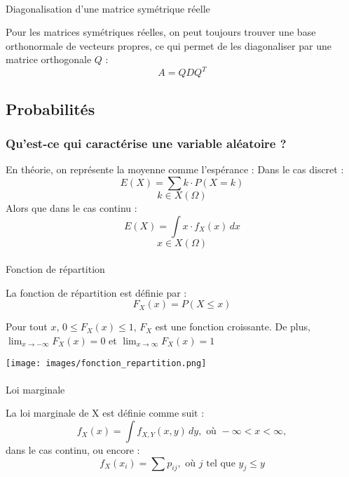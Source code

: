 \documentclass[
  letterpaper,
  DIV=11,
  numbers=noendperiod]{scrartcl}
\makeatletter
\let\oldparagraph\paragraph
\renewcommand{\paragraph}{
    \@ifstar
      \xxxParagraphStar
      \xxxParagraphNoStar
  }
\newcommand{\xxxParagraphStar}[1]{\oldparagraph*{#1}\mbox{}}
\newcommand{\xxxParagraphNoStar}[1]{\oldparagraph{#1}\mbox{}}
\makeatother
\begin{document}
\paragraph{Diagonalisation d'une matrice symétrique
réelle}\label{diagonalisation-dune-matrice-symuxe9trique-ruxe9elle}

Pour les matrices symétriques réelles, on peut toujours trouver une base
orthonormale de vecteurs propres, ce qui permet de les diagonaliser par
une matrice orthogonale \(Q\) : \[A = QDQ^T\]

\subsection{Probabilités}\label{probabilituxe9s}

\subsubsection{Qu'est-ce qui caractérise une variable aléatoire
?}\label{quest-ce-qui-caractuxe9rise-une-variable-aluxe9atoire}

En théorie, on représente la moyenne comme l'espérance : Dans le cas
discret : \[E(X) = \sum k \cdot P(X = k)\] \[k \in X(\Omega)\] Alors que
dans le cas continu : \[E(X) = \int x \cdot f_X(x) \, dx\]
\[x \in X(\Omega)\]

\paragraph{Fonction de répartition}\label{fonction-de-ruxe9partition}

La fonction de répartition est définie par :
\[F_X(x) = P(X \leqslant x)\]

Pour tout \(x\), \(0 \leqslant F_X(x) \leqslant 1\), \(F_X\) est une
fonction croissante. De plus, \(\lim_{x \to -\infty} F_X(x) = 0\) et
\(\lim_{x \to \infty} F_X(x) = 1\)

\begin{center}
\texttt{[image: images/fonction\_repartition.png]}
\end{center}

\paragraph{Loi marginale}\label{loi-marginale}

La loi marginale de X est définie comme suit :
\[f_X(x) = \int f_{X, Y}(x, y) \, dy, \text{ où } -\infty < x < \infty,\]
dans le cas continu, ou encore :
\[f_X(x_i) = \sum p_{ij}, \text{ où } j \text{ tel que } y_j \leqslant y\]
\end{document}
